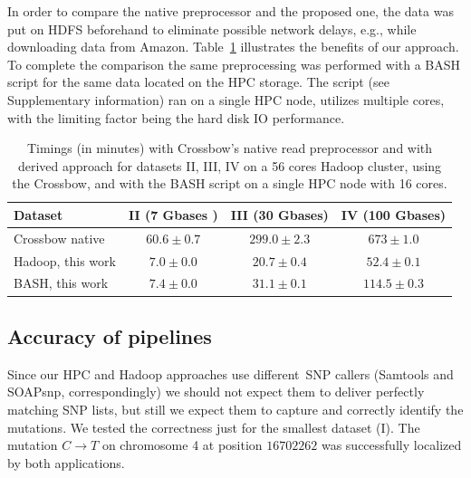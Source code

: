 \documentclass[11pt, oneside]{article}   	%
\newcommand{\COMMENT}[1]{{\color{red} #1 }}
\begin{document}
In order to compare the native preprocessor and the proposed one, the data was put on HDFS beforehand to eliminate possible network delays, e.g., while downloading data from Amazon.
Table~\ref{table:preprocess} illustrates the benefits of our approach.
To complete the comparison the same preprocessing was performed with a BASH script for the same data located on the HPC storage. The script (see Supplementary information) ran on a single HPC node, utilizes multiple cores, with the limiting factor being the hard disk IO performance.%

\begin{table}[tdp]
\small
\caption{Timings (in minutes) with Crossbow's native read preprocessor and with derived approach for  datasets II, III, IV  on a 56 cores Hadoop cluster, using the Crossbow, and with the BASH script on a single HPC node with 16 cores.}
\begin{center}
\begin{tabular}{l|c|c|c}
Dataset			&		II (7 Gbases )	& III (30 Gbases)	& IV (100 Gbases)\\
\hline
Crossbow native			&		$60.6\pm0.7$	& $299.0\pm2.3$	&	$673\pm1.0$	\\
Hadoop, this work			&		$7.0\pm0.0$	&	$20.7\pm0.4$&		$52.4\pm0.1$\\
BASH, this work			& 		$7.4\pm0.0$	&	$31.1\pm0.1$	&	$114.5\pm0.3$	\\
\end{tabular}
\end{center}
\label{table:preprocess}
\normalsize
\end{table}%



\subsection{Accuracy of pipelines}
Since our HPC and Hadoop approaches use different~SNP callers (Samtools and SOAPsnp, correspondingly) we should not expect them to deliver perfectly matching SNP lists, but still we expect them to capture and correctly identify the mutations. We tested the correctness just for the smallest dataset (I). The mutation $C\rightarrow T$ on chromosome 4 at position $16702262$\cite{schneeberger} was successfully localized by both applications.
\end{document}
